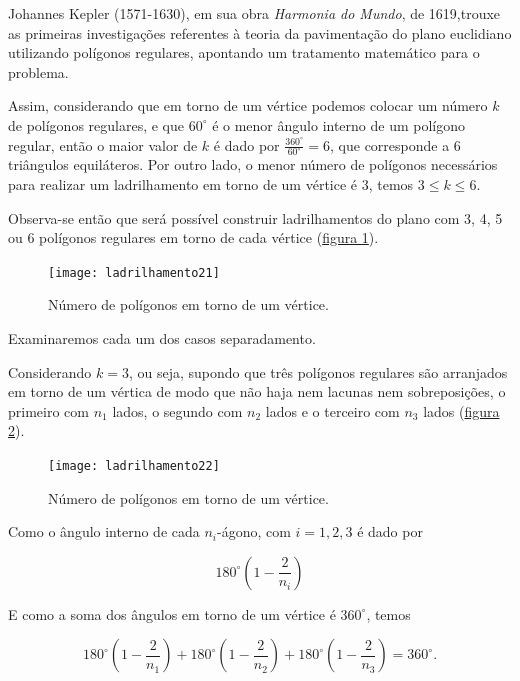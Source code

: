 \begin{knowledge}
Johannes Kepler (1571-1630), em sua obra \textit{Harmonia do Mundo}, de 1619,trouxe as primeiras investigações referentes à teoria da pavimentação do plano euclidiano utilizando polígonos regulares, apontando um tratamento matemático para o problema.
\end{knowledge}




Assim, considerando que em torno de um vértice podemos colocar um número $k$ de polígonos regulares, e que $60^{\circ}$ é o menor ângulo interno de um polígono regular, então o maior valor de $k$ é dado por $\displaystyle \frac{360^{\circ}}{60^{\circ}} = 6$, que corresponde a 6 triângulos equiláteros. Por outro lado, o menor número de polígonos necessários para realizar um ladrilhamento em torno de um vértice é 3, temos  $3\leq k \leq 6$.

Observa-se então que será possível construir ladrilhamentos do plano com 3, 4, 5 ou 6 polígonos regulares em torno de cada vértice (\hyperref[lad_tp3]{figura \ref{lad_tp3}}).

\begin{figure}[H]
\centering
\texttt{[image: ladrilhamento21]}
\caption{Número de polígonos em torno de um vértice.}
\label{lad_tp3}
\end{figure}

Examinaremos cada um dos casos separadamento.

Considerando $k=3$, ou seja, supondo que três polígonos regulares são arranjados em torno de um vértica de modo que não haja nem lacunas nem sobreposições, o primeiro com $n_1$ lados, o segundo com $n_2$ lados e o terceiro com $n_3$ lados (\hyperref[lad_tp4]{figura \ref{lad_tp4}}).

\begin{figure}[H]
\centering
\texttt{[image: ladrilhamento22]}
\caption{Número de polígonos em torno de um vértice.}
\label{lad_tp4}
\end{figure}

Como o ângulo interno de cada $n_i$-ágono, com $i=1,2,3$ é dado por

\begin{equation*}
180^{\circ}\left(1-\frac{2}{n_i}\right)
\end{equation*}

E como a soma dos ângulos em torno de um vértice é $360^{\circ}$, temos

\begin{equation*}
180^{\circ}\left(1-\frac{2}{n_1}\right)+180^{\circ}\left(1-\frac{2}{n_2}\right)+180^{\circ}\left(1-\frac{2}{n_3}\right)=360^{\circ}.
\end{equation*}

